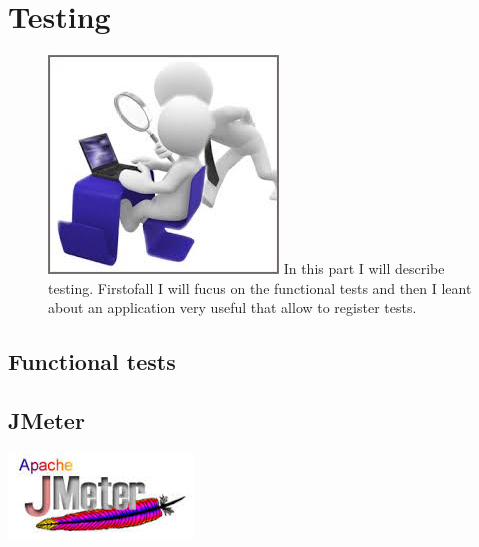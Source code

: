 
\section{Testing}
	\begin{figure}[h]
		\includegraphics[scale=0.3]{Images/testing.jpeg}
	 In this part I will describe testing. Firstofall I will fucus on the functional tests and then I leant about an application very useful that allow to register tests. \\
	\end{figure}

\subsection{Functional tests}


\subsection{JMeter}
\includegraphics[]{Images/JMeter.jpeg}


